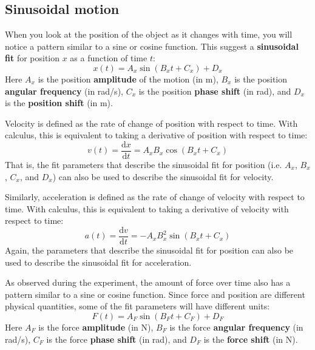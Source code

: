 \subsection{Sinusoidal motion}
%
When you look at the position of the object as it changes with time, you will notice a pattern similar to a sine or cosine function. This suggest a \textbf{sinusoidal fit} for position $x$ as a function of time $t$:
\begin{equation}
    x(t) = A_{x} \sin\left( B_{x}t + C_{x} \right) + D_{x}
\end{equation}
Here $A_{x}$ is the position \textbf{amplitude} of the motion (in m), $B_{x}$ is the position \textbf{angular frequency} (in rad/s), $C_{x}$ is the position \textbf{phase shift} (in rad), and $D_{x}$ is the \textbf{position shift} (in m).

Velocity is defined as the rate of change of position with respect to time. With calculus, this is equivalent to taking a derivative of position with respect to time:
\begin{equation}
    v(t) = \frac{\mathrm{d} x}{\mathrm{d} t} = A_{x}B_{x} \cos\left( B_{x}t + C_{x} \right)
    \label{eq.11.v}
\end{equation}
That is, the fit parameters that describe the sinusoidal fit for position (i.e. $A_{x}$, $B_{x}$, $C_{x}$, and $D_{x}$) can also be used to describe the sinusoidal fit for velocity.

Similarly, acceleration is defined as the rate of change of velocity with respect to time. With calculus, this is equivalent to taking a derivative of velocity with respect to time:
\begin{equation}
    a(t) = \frac{\mathrm{d} v}{\mathrm{d} t} = -A_{x}B^{2}_{x} \sin\left( B_{x}t + C_{x} \right)
    \label{eq.11.a}
\end{equation}
Again, the parameters that describe the sinusoidal fit for position can also be used to describe the sinusoidal fit for acceleration.

As observed during the experiment, the amount of force over time also has a pattern similar to a sine or cosine function. Since force and position are different physical quantities, some of the fit parameters will have different units:
\begin{equation}
    F(t) = A_{F} \sin\left(B_{F} t + C_{F}\right) + D_{F}
\end{equation}
Here $A_{F}$ is the force \textbf{amplitude} (in N), $B_{F}$ is the force \textbf{angular frequency} (in rad/s), $C_{F}$ is the force \textbf{phase shift} (in rad), and $D_{F}$ is the \textbf{force shift} (in N).

